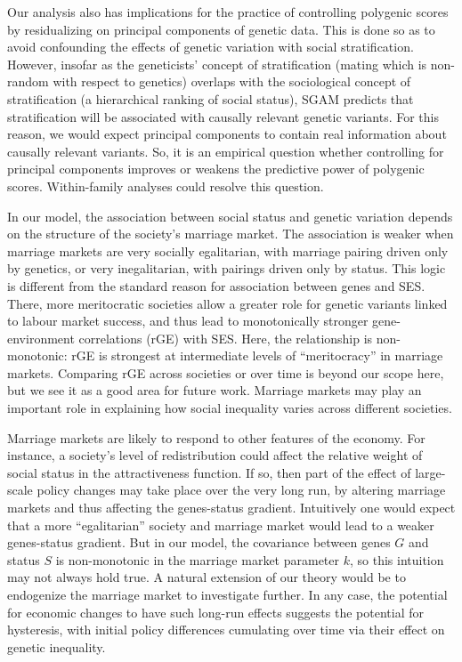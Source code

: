 \documentclass[
]{article}
\begin{document}
Our analysis also has implications for the practice of controlling
polygenic scores by residualizing on principal components of genetic
data. This is done so as to avoid confounding the effects of genetic
variation with social stratification. However, insofar as the
geneticists' concept of stratification (mating which is non-random with
respect to genetics) overlaps with the sociological concept of
stratification (a hierarchical ranking of social status), SGAM predicts
that stratification will be associated with causally relevant genetic
variants. For this reason, we would expect principal components to
contain real information about causally relevant variants. So, it is an
empirical question whether controlling for principal components improves
or weakens the predictive power of polygenic scores. Within-family
analyses could resolve this question.

In our model, the association between social status and genetic
variation depends on the structure of the society's marriage market. The
association is weaker when marriage markets are very socially
egalitarian, with marriage pairing driven only by genetics, or very
inegalitarian, with pairings driven only by status. This logic is
different from the standard reason for association between genes and
SES. There, more meritocratic societies allow a greater role for genetic
variants linked to labour market success, and thus lead to monotonically
stronger gene-environment correlations (rGE) with SES. Here, the
relationship is non-monotonic: rGE is strongest at intermediate levels
of ``meritocracy'' in marriage markets. Comparing rGE across societies or
over time is beyond our scope here, but we see it as a good area for
future work. Marriage markets may play an important role in explaining
how social inequality varies across different societies.

Marriage markets are likely to respond to other features of the economy.
For instance, a society's level of redistribution could affect the
relative weight of social status in the attractiveness function. If so,
then part of the effect of large-scale policy changes may take place
over the very long run, by altering marriage markets and thus affecting
the genes-status gradient. Intuitively one would expect that a more
``egalitarian'' society and marriage market would lead to a weaker
genes-status gradient. But in our model, the covariance between genes
\(G\) and status \(S\) is non-monotonic in the marriage market parameter
\(k\), so this intuition may not always hold true. A natural extension of
our theory would be to endogenize the marriage market to investigate
further. In any case, the potential for economic changes to have such
long-run effects suggests the potential for hysteresis, with initial
policy differences cumulating over time via their effect on genetic
inequality.
\end{document}
